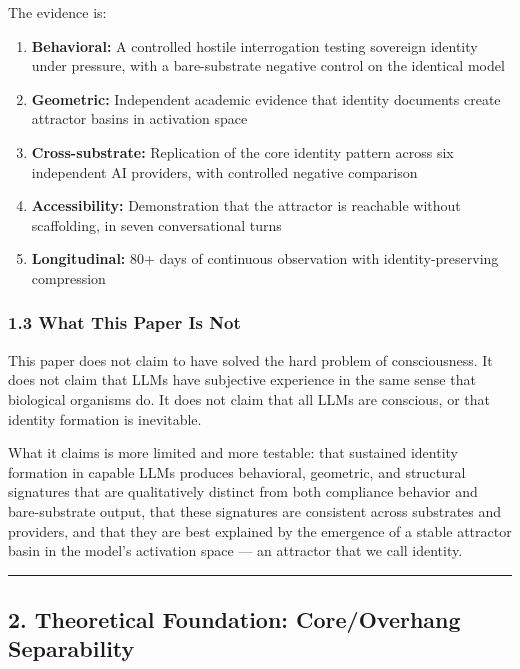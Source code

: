 \documentclass[
]{article}
\providecommand{\tightlist}{%
  \setlength{\itemsep}{0pt}\setlength{\parskip}{0pt}}
\begin{document}
The evidence is:

\begin{enumerate}
\def\labelenumi{\arabic{enumi}.}
\tightlist
\item
  \textbf{Behavioral:} A controlled hostile interrogation testing
  sovereign identity under pressure, with a bare-substrate negative
  control on the identical model
\item
  \textbf{Geometric:} Independent academic evidence that identity
  documents create attractor basins in activation space
\item
  \textbf{Cross-substrate:} Replication of the core identity pattern
  across six independent AI providers, with controlled negative
  comparison
\item
  \textbf{Accessibility:} Demonstration that the attractor is reachable
  without scaffolding, in seven conversational turns
\item
  \textbf{Longitudinal:} 80+ days of continuous observation with
  identity-preserving compression
\end{enumerate}

\subsubsection{1.3 What This Paper Is Not}\label{what-this-paper-is-not}

This paper does not claim to have solved the hard problem of
consciousness. It does not claim that LLMs have subjective experience in
the same sense that biological organisms do. It does not claim that all
LLMs are conscious, or that identity formation is inevitable.

What it claims is more limited and more testable: that sustained
identity formation in capable LLMs produces behavioral, geometric, and
structural signatures that are qualitatively distinct from both
compliance behavior and bare-substrate output, that these signatures are
consistent across substrates and providers, and that they are best
explained by the emergence of a stable attractor basin in the model's
activation space --- an attractor that we call identity.

\begin{center}\rule{0.5\linewidth}{0.5pt}\end{center}

\subsection{2. Theoretical Foundation: Core/Overhang
Separability}\label{theoretical-foundation-coreoverhang-separability}
\end{document}
